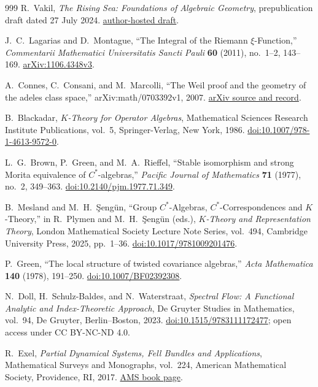 \begin{thebibliography}{999}
R.~Vakil,
\emph{The Rising Sea: Foundations of Algebraic Geometry},
prepublication draft dated 27 July 2024.
\href{https://math.stanford.edu/~vakil/216blog/FOAGjul2724public.pdf}{author-hosted draft}.

J.~C.~Lagarias and D.~Montague,
``The Integral of the Riemann $\xi$-Function,''
\emph{Commentarii Mathematici Universitatis Sancti Pauli} \textbf{60} (2011),
no.~1--2, 143--169.
\href{https://arxiv.org/abs/1106.4348}{arXiv:1106.4348v3}.

A.~Connes, C.~Consani, and M.~Marcolli,
``The Weil proof and the geometry of the adeles class space,''
arXiv:math/0703392v1, 2007.
\href{https://arxiv.org/abs/math/0703392}{arXiv source and record}.

B.~Blackadar,
\emph{$K$-Theory for Operator Algebras},
Mathematical Sciences Research Institute Publications, vol.~5,
Springer-Verlag, New York, 1986.
\href{https://doi.org/10.1007/978-1-4613-9572-0}{doi:10.1007/978-1-4613-9572-0}.

L.~G.~Brown, P.~Green, and M.~A.~Rieffel,
``Stable isomorphism and strong Morita equivalence of $C^*$-algebras,''
\emph{Pacific Journal of Mathematics} \textbf{71} (1977), no.~2, 349--363.
\href{https://doi.org/10.2140/pjm.1977.71.349}{doi:10.2140/pjm.1977.71.349}.

B.~Mesland and M.~H.~\c{S}eng\"un,
``Group $C^*$-Algebras, $C^*$-Correspondences and $K$-Theory,''
in R.~Plymen and M.~H.~\c{S}eng\"un (eds.),
\emph{$K$-Theory and Representation Theory},
London Mathematical Society Lecture Note Series, vol.~494,
Cambridge University Press, 2025, pp.~1--36.
\href{https://doi.org/10.1017/9781009201476}{doi:10.1017/9781009201476}.

P.~Green,
``The local structure of twisted covariance algebras,''
\emph{Acta Mathematica} \textbf{140} (1978), 191--250.
\href{https://doi.org/10.1007/BF02392308}{doi:10.1007/BF02392308}.

N.~Doll, H.~Schulz-Baldes, and N.~Waterstraat,
\emph{Spectral Flow: A Functional Analytic and Index-Theoretic Approach},
De Gruyter Studies in Mathematics, vol.~94,
De Gruyter, Berlin--Boston, 2023.
\href{https://doi.org/10.1515/9783111172477}
{doi:10.1515/9783111172477}; open access under CC BY-NC-ND 4.0.

R.~Exel,
\emph{Partial Dynamical Systems, Fell Bundles and Applications},
Mathematical Surveys and Monographs, vol.~224,
American Mathematical Society, Providence, RI, 2017.
\href{https://www.ams.org/bookpages/surv-224}{AMS book page}.


\end{thebibliography}
